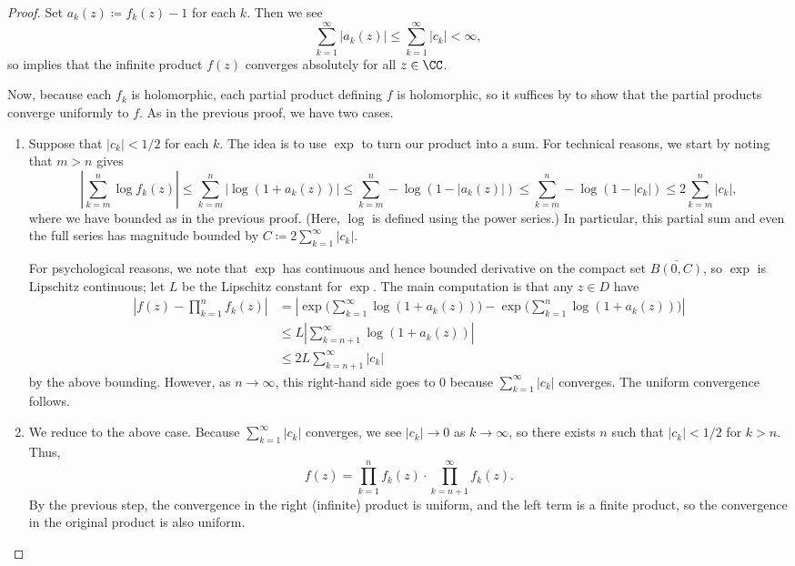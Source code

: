 \documentclass[notes.tex]{subfiles}
\begin{document}
\begin{proof}
	Set $a_k(z)\coloneqq f_k(z)-1$ for each $k$. Then we see
	\[\sum_{k=1}^\infty|a_k(z)|\le\sum_{k=1}^\infty|c_k|<\infty,\]
	so  implies that the infinite product $f(z)$ converges absolutely for all $z\in\CC$.

	Now, because each $f_k$ is holomorphic, each partial product defining $f$ is holomorphic, so it suffices by  to show that the partial products converge uniformly to $f$. As in the previous proof, we have two cases.
	\begin{enumerate}
		\item Suppose that $|c_k|<1/2$ for each $k$. The idea is to use $\exp$ to turn our product into a sum. For technical reasons, we start by noting that $m>n$ gives
		\[\left|\sum_{k=m}^n\log f_k(z)\right|\le\sum_{k=m}^n|\log(1+a_k(z))|\le\sum_{k=m}^n-\log(1-|a_k(z)|)\le\sum_{k=m}^n-\log(1-|c_k|)\le2\sum_{k=m}^n|c_k|,\]
		where we have bounded as in the previous proof. (Here, $\log$ is defined using the power series.) In particular, this partial sum and even the full series has magnitude bounded by $C\coloneqq2\sum_{k=1}^\infty|c_k|$.

		For psychological reasons, we note that $\exp$ has continuous and hence bounded derivative on the compact set $\overline{B(0,C)}$, so $\exp$ is Lipschitz continuous; let $L$ be the Lipschitz constant for $\exp$. The main computation is that any $z\in D$ have
		\begin{align*}
			\left|f(z)-\prod_{k=1}^nf_k(z)\right| &= \left|\exp\Bigg(\sum_{k=1}^\infty\log(1+a_k(z))\Bigg)-\exp\Bigg(\sum_{k=1}^n\log(1+a_k(z))\Bigg)\right| \\
			&\le L\left|\sum_{k=n+1}^\infty\log(1+a_k(z))\right| \\
			&\le 2L\sum_{k=n+1}^\infty|c_k|
		\end{align*}
		by the above bounding. However, as $n\to\infty$, this right-hand side goes to $0$ because $\sum_{k=1}^\infty|c_k|$ converges. The uniform convergence follows.

		\item We reduce to the above case. Because $\sum_{k=1}^\infty|c_k|$ converges, we see $|c_k|\to0$ as $k\to\infty$, so there exists $n$ such that $|c_k|<1/2$ for $k>n$. Thus,
		\[f(z)=\prod_{k=1}^nf_k(z)\cdot\prod_{k=n+1}^\infty f_k(z).\]
		By the previous step, the convergence in the right (infinite) product is uniform, and the left term is a finite product, so the convergence in the original product is also uniform.
		\qedhere
	\end{enumerate}
\end{proof}
\end{document}

